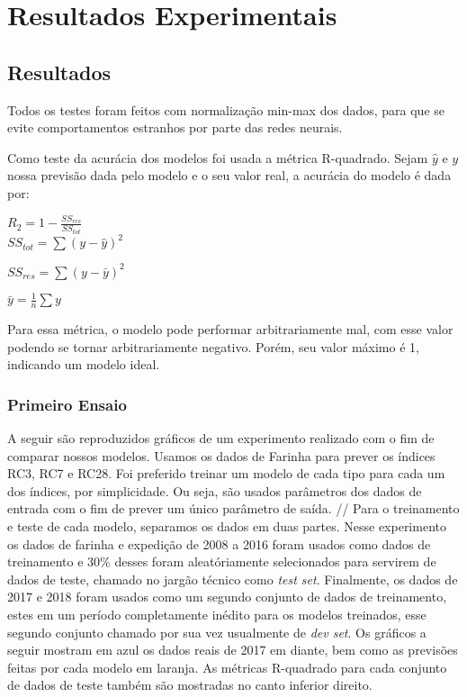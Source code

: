 \chapter{Resultados Experimentais }
\label{cap:resultados}

\section{Resultados}


Todos os testes foram feitos com normalização min-max dos dados, para que se evite comportamentos estranhos por parte das redes neurais. \\

\bigskip

Como teste da acurácia dos modelos foi usada a métrica R-quadrado. Sejam $\hat{y}$ e $y$ nossa previsão dada pelo modelo e o seu valor real, a acurácia do modelo é dada por:\\

\bigskip

\centering
$R_2 = 1 - \frac{SS_{res}}{SS_{tot}}$\\

$SS_{tot} = \sum (y - \hat{y})^2$

$SS_{res} = \sum (y - \bar{y})^2$

$  \bar{y} = \frac{1}{n} \sum y$
\bigskip

Para essa métrica, o modelo pode performar arbitrariamente mal, com esse valor podendo se tornar arbitrariamente negativo. Porém, seu valor máximo é 1, indicando um modelo ideal.\\

\bigskip
\subsection{Primeiro Ensaio}
A seguir são reproduzidos gráficos de um experimento realizado com o fim de comparar nossos modelos. Usamos os dados de Farinha para prever os índices RC3, RC7 e RC28. Foi preferido treinar um modelo de cada tipo para cada um dos índices, por simplicidade. Ou seja, são usados parâmetros dos dados de entrada com o fim de prever um único parâmetro de saída. //
Para o treinamento e teste de cada modelo, separamos os dados em duas partes. Nesse experimento os dados de farinha e expedição de 2008 a 2016 foram usados como dados de treinamento e 30\% desses foram aleatóriamente selecionados para servirem de dados de teste, chamado no jargão técnico como \textit{test set}. Finalmente, os dados de 2017 e 2018 foram usados como um segundo conjunto de dados de treinamento, estes em um período completamente inédito para os modelos treinados, esse segundo conjunto chamado por sua vez usualmente de \textit{dev set}. Os gráficos a seguir mostram em azul os dados reais de 2017 em diante, bem como as previsões feitas por cada modelo em laranja. As métricas R-quadrado para cada conjunto de dados de teste também são mostradas no canto inferior direito.



